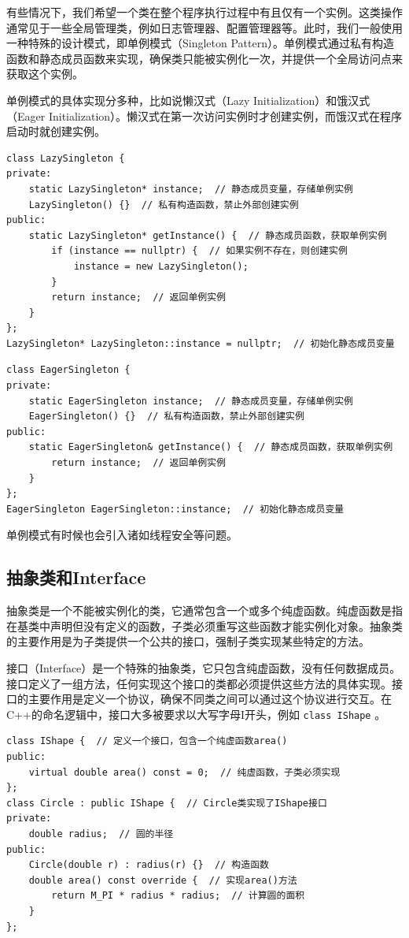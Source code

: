 有些情况下，我们希望一个类在整个程序执行过程中有且仅有一个实例。这类操作通常见于一些全局管理类，例如日志管理器、配置管理器等。此时，我们一般使用一种特殊的设计模式，即单例模式（Singleton Pattern）。单例模式通过私有构造函数和静态成员函数来实现，确保类只能被实例化一次，并提供一个全局访问点来获取这个实例。

单例模式的具体实现分多种，比如说懒汉式（Lazy Initialization）和饿汉式（Eager Initialization）。懒汉式在第一次访问实例时才创建实例，而饿汉式在程序启动时就创建实例。
\begin{verbatim}
class LazySingleton {
private:
    static LazySingleton* instance;  // 静态成员变量，存储单例实例
    LazySingleton() {}  // 私有构造函数，禁止外部创建实例
public:
    static LazySingleton* getInstance() {  // 静态成员函数，获取单例实例
        if (instance == nullptr) {  // 如果实例不存在，则创建实例
            instance = new LazySingleton();
        }
        return instance;  // 返回单例实例
    }
};
LazySingleton* LazySingleton::instance = nullptr;  // 初始化静态成员变量
\end{verbatim}

\begin{verbatim}
class EagerSingleton {
private:
    static EagerSingleton instance;  // 静态成员变量，存储单例实例
    EagerSingleton() {}  // 私有构造函数，禁止外部创建实例
public:
    static EagerSingleton& getInstance() {  // 静态成员函数，获取单例实例
        return instance;  // 返回单例实例
    }
};
EagerSingleton EagerSingleton::instance;  // 初始化静态成员变量
\end{verbatim}

单例模式有时候也会引入诸如线程安全等问题。

\subsection{抽象类和Interface}

抽象类是一个不能被实例化的类，它通常包含一个或多个纯虚函数。纯虚函数是指在基类中声明但没有定义的函数，子类必须重写这些函数才能实例化对象。抽象类的主要作用是为子类提供一个公共的接口，强制子类实现某些特定的方法。

接口（Interface）是一个特殊的抽象类，它只包含纯虚函数，没有任何数据成员。接口定义了一组方法，任何实现这个接口的类都必须提供这些方法的具体实现。接口的主要作用是定义一个协议，确保不同类之间可以通过这个协议进行交互。在C++的命名逻辑中，接口大多被要求以大写字母I开头，例如 \texttt{class IShape} 。
\begin{verbatim}
class IShape {  // 定义一个接口，包含一个纯虚函数area()
public:
    virtual double area() const = 0;  // 纯虚函数，子类必须实现
};
class Circle : public IShape {  // Circle类实现了IShape接口
private:
    double radius;  // 圆的半径
public:
    Circle(double r) : radius(r) {}  // 构造函数
    double area() const override {  // 实现area()方法
        return M_PI * radius * radius;  // 计算圆的面积
    }
};
\end{verbatim}

